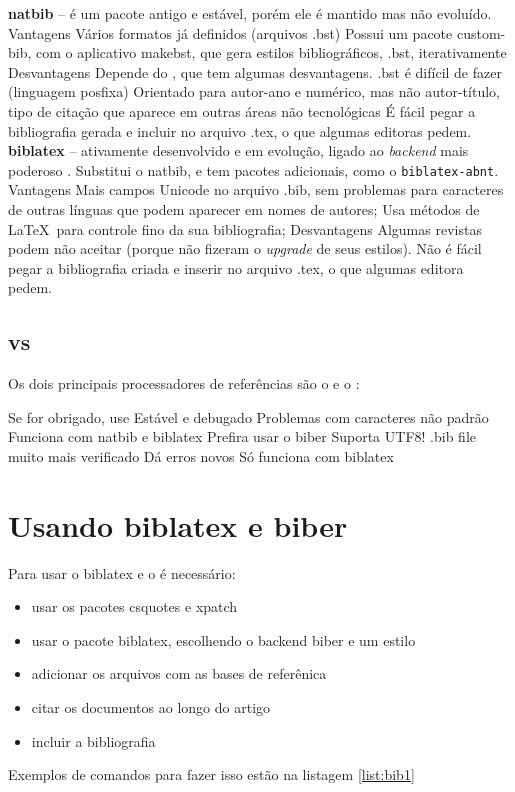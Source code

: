 \begin{outline}
    \1 \textbf{natbib} -- é um pacote antigo e estável, porém ele é  mantido mas não evoluído. 
    \2 Vantagens
    \3 Vários formatos já definidos (arquivos .bst)
    \3 Possui um pacote custom-bib, com o aplicativo makebst, que gera estilos bibliográficos, .bst, iterativamente
    \2 Desvantagens
    \3 Depende do , que tem algumas desvantagens.
    \3 .bst é difícil de fazer (linguagem posfixa)
    \3 Orientado para autor-ano e numérico, mas não autor-título, tipo de citação que aparece em outras áreas não tecnológicas
    \3 É fácil pegar a bibliografia gerada e incluir no arquivo .tex, o que algumas editoras pedem.
    \1 \textbf{biblatex} -- ativamente desenvolvido e em evolução, ligado
    ao \textit{backend} mais poderoso . Substitui o natbib, e tem pacotes adicionais, como o \lstinline|biblatex-abnt|.
    \2 Vantagens
    \3 Mais campos
    \3 Unicode no arquivo .bib, sem problemas para caracteres de outras línguas que podem aparecer em nomes de autores;
    \3 Usa métodos de \LaTeX\ para controle fino da sua bibliografia;
    \2 Desvantagens
    \3 Algumas revistas podem não aceitar (porque não fizeram o
     \textit{upgrade} de seus estilos).
    \3 Não é fácil pegar a bibliografia criada e inserir no arquivo .tex, o que algumas editora pedem.
\end{outline}


\subsection{ vs }

Os dois principais processadores de referências são o  e o  :
\begin{outline}
    \1 
    \2 Se for obrigado, use 
    \2 Estável e debugado
    \2 Problemas com caracteres não padrão 
    \2 Funciona com natbib e biblatex
    \1 
    \2 Prefira usar o  biber
    \2 Suporta UTF8!
    \2 .bib file muito mais verificado
    \3 Dá erros novos
    \2 Só funciona com biblatex
\end{outline}



\section{Usando biblatex e biber}

Para usar o biblatex e o  é necessário:
\begin{itemize}
    \item usar os pacotes csquotes e xpatch
    \item usar o pacote biblatex, escolhendo o backend biber e um estilo
    \item adicionar os arquivos com as bases de referênica
    \item citar os documentos ao longo do artigo
    \item incluir a bibliografia
\end{itemize}
Exemplos de comandos para fazer isso estão na listagem \ref{list:bib1}

